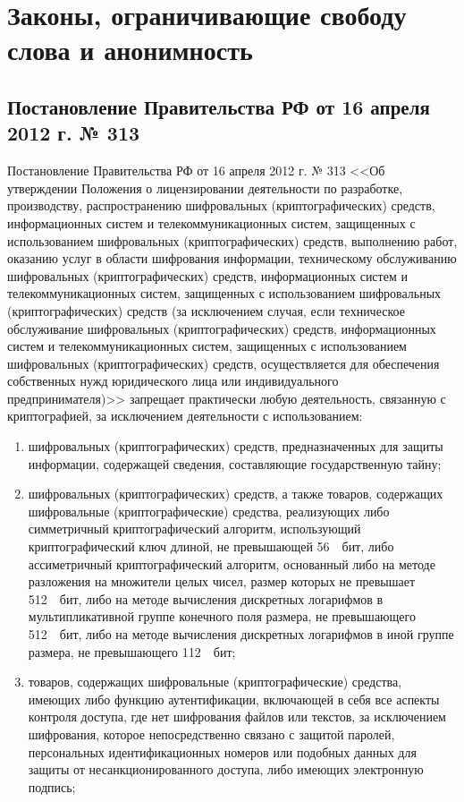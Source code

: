 \chapter{Законы, ограничивающие свободу слова и анонимность}
\section{Постановление Правительства РФ от 16 апреля 2012 г. № 313}
{Постановление Правительства РФ от 16 апреля 2012 г. № 313 <<Об утверждении Положения о лицензировании деятельности по разработке, производству, распространению шифровальных (криптографических) средств, информационных систем и телекоммуникационных систем, защищенных с использованием шифровальных (криптографических) средств, выполнению работ, оказанию услуг в области шифрования информации, техническому обслуживанию шифровальных (криптографических) средств, информационных систем и телекоммуникационных систем, защищенных с использованием шифровальных (криптографических) средств (за исключением случая, если техническое обслуживание шифровальных (криптографических) средств, информационных систем и телекоммуникационных систем, защищенных с использованием шифровальных (криптографических) средств, осуществляется для обеспечения собственных нужд юридического лица или индивидуального предпринимателя)>> запрещает практически любую деятельность, связанную с криптографией, за исключением деятельности с использованием:
\begin{enumerate}
\item шифровальных (криптографических) средств, предназначенных для защиты информации, содержащей сведения, составляющие государственную тайну;
\item шифровальных (криптографических) средств, а также товаров, содержащих шифровальные (криптографические) средства, реализующих либо симметричный криптографический алгоритм, использующий криптографический ключ длиной, не превышающей 56  бит, либо ассиметричный криптографический алгоритм, основанный либо на методе разложения на множители целых чисел, размер которых не превышает 512  бит, либо на методе вычисления дискретных логарифмов в мультипликативной группе конечного поля размера, не превышающего 512  бит, либо на методе вычисления дискретных логарифмов в иной группе размера, не превышающего 112  бит;
\item товаров, содержащих шифровальные (криптографические) средства, имеющих либо функцию аутентификации, включающей в себя все аспекты контроля доступа, где нет шифрования файлов или текстов, за исключением шифрования, которое непосредственно связано с защитой паролей, персональных идентификационных номеров или подобных данных для защиты от несанкционированного доступа, либо имеющих электронную подпись;

\end{enumerate}}
